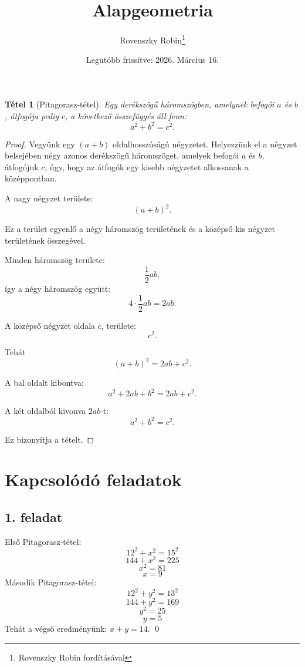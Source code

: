 \documentclass{article}
\title{Alapgeometria}
\author{Rovenszky Robin\thanks{Rovenszky Robin fordításával}}
\date{Legutóbb frissítve: 2026. Március 16.}
\newtheorem{theorem}{Tétel}
\begin{document}
\maketitle
\tableofcontents
\newpage

\begin{theorem}[Pitagorasz-tétel]
Egy derékszögű háromszögben, amelynek befogói $a$ és $b$, átfogója pedig $c$, a következő összefüggés áll fenn:
\[
a^2 + b^2 = c^2.
\]
\end{theorem}

\begin{proof}
Vegyünk egy $(a+b)$ oldalhosszúságú négyzetet. Helyezzünk el a négyzet belsejében négy azonos derékszögű háromszöget, amelyek befogói $a$ és $b$, átfogójuk $c$, úgy, hogy az átfogók egy kisebb négyzetet alkossanak a középpontban.

A nagy négyzet területe:
\[
(a+b)^2.
\]

Ez a terület egyenlő a négy háromszög területének és a középső kis négyzet területének összegével.

Minden háromszög területe:
\[
\frac{1}{2}ab,
\]
így a négy háromszög együtt:
\[
4 \cdot \frac{1}{2}ab = 2ab.
\]

A középső négyzet oldala $c$, területe:
\[
c^2.
\]

Tehát
\[
(a+b)^2 = 2ab + c^2.
\]

A bal oldalt kibontva:
\[
a^2 + 2ab + b^2 = 2ab + c^2.
\]

A két oldalból kivonva $2ab$-t:
\[
a^2 + b^2 = c^2.
\]

Ez bizonyítja a tételt.
\end{proof}

\newpage

\section{Kapcsolódó feladatok}

\subsection{1. feladat}

Első Pitagorasz-tétel:
\begin{equation}
    12^2 + x^2 = 15^2
\end{equation}
\begin{equation}
    144+x^2 = 225
\end{equation}
\begin{equation}
    x^2 = 81
\end{equation}
\begin{equation}
    x = 9
\end{equation}
Második Pitagorasz-tétel:
\begin{equation}
    12^2 + y^2 = 13^2
\end{equation}
\begin{equation}
    144 + y^2 = 169
\end{equation}
\begin{equation}
    y^2 = 25
\end{equation}
\begin{equation}
    y = 5
\end{equation}
Tehát a végső eredményünk: $x + y = 14$. \qed
\end{document}
